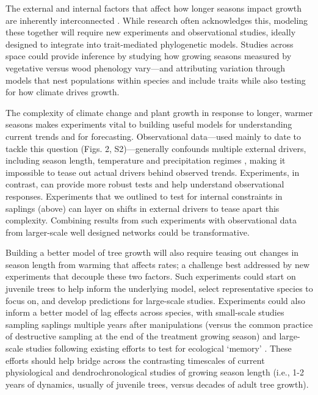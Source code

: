 \documentclass[11pt]{article}
\begin{document}
The external and internal factors that affect how longer seasons impact growth are inherently interconnected \citep{nobel1983biophysical}. While research often acknowledges this, modeling these together will require new experiments and observational studies, ideally designed to integrate into trait-mediated phylogenetic models. Studies across space could provide inference by studying how growing seasons measured by vegetative versus wood phenology vary---and attributing variation through models that nest populations within species and include traits while also testing for how climate drives growth.  


The complexity of climate change and plant growth in response to longer, warmer seasons makes experiments vital to building useful models for understanding current trends and for forecasting. Observational data---used mainly to date to tackle this question (Figs. 2, S2)---generally confounds multiple external drivers, including season length, temperature and precipitation regimes \citep{ren2019,ipcc2021,camarero2022decoupled}, making it impossible to tease out actual drivers behind observed trends. Experiments, in contrast, can provide more robust tests and help understand observational responses. Experiments that we outlined to test for internal constraints in saplings (above) can layer on shifts in external drivers to tease apart this complexity. Combining results from such experiments with observational data from larger-scale well designed networks \citep[see][]{schuldt2020first} could be transformative. 

Building a better model of tree growth will also require teasing out changes in season length from warming that affects rates; a challenge best addressed by new experiments that decouple these two factors. Such experiments could start on juvenile trees to help inform the underlying model, select representative species to focus on, and  develop predictions for large-scale studies. Experiments could also inform a better model of lag effects across species, with small-scale studies sampling saplings multiple years after manipulations (versus the common practice of destructive sampling at the end of the treatment growing season) and large-scale studies following existing efforts to test for ecological `memory'  \citep[e.g. ][]{flinker2021promise,schweiger2022transgenerational,chinmemory}. These efforts should help bridge across the contrasting timescales of current physiological and dendrochronological studies of growing season length (i.e., 1-2 years of dynamics, usually of juvenile trees, versus decades of adult tree growth).
\end{document}
